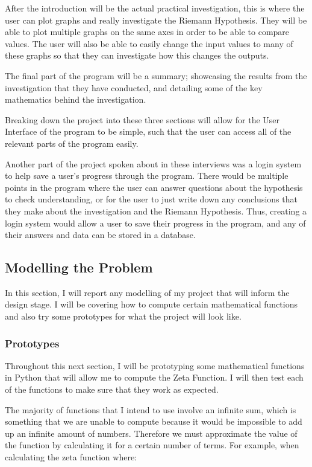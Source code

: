\documentclass{article}
\begin{document}
After the introduction will be the actual practical investigation, this is where the user can plot graphs and really investigate the Riemann Hypothesis. They will be able to plot multiple graphs on the same axes in order to be able to compare values. The user will also be able to easily change the input values to many of these graphs so that they can investigate how this changes the outputs.

The final part of the program will be a summary; showcasing the results from the investigation that they have conducted, and detailing some of the key mathematics behind the investigation.

Breaking down the project into these three sections will allow for the User Interface of the program to be simple, such that the user can access all of the relevant parts of the program easily.

Another part of the project spoken about in these interviews was a login system to help save a user's progress through the program. There would be multiple points in the program where the user can answer questions about the hypothesis to check understanding, or for the user to just write down any conclusions that they make about the investigation and the Riemann Hypothesis. Thus, creating a login system would allow a user to save their progress in the program, and any of their answers and data can be stored in a database.
\clearpage
\subsection{Modelling the Problem}
In this section, I will report any modelling of my project that will inform the design stage. I will be covering how to compute certain mathematical functions and also try some prototypes for what the project will look like.

\subsubsection{Prototypes}

Throughout this next section, I will be prototyping some mathematical functions in Python that will allow me to compute the Zeta Function. I will then test each of the functions to make sure that they work as expected.

The majority of functions that I intend to use involve an infinite sum, which is something that we are unable to compute because it would be impossible to add up an infinite amount of numbers. Therefore we must approximate the value of the function by calculating it for a certain number of terms. For example, when calculating the zeta function where:
\end{document}
